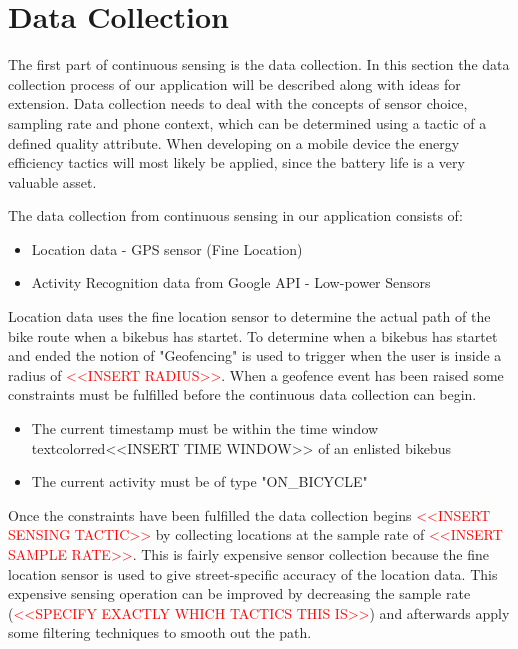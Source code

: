 


\section{Data Collection}

The first part of continuous sensing is the data collection. In this section the data collection process of our application will be described along with ideas for extension.
Data collection needs to deal with the concepts of sensor choice, sampling rate and phone context, which can be determined using a tactic of a defined quality attribute. When developing on a mobile device the energy efficiency tactics will most likely be applied, since the battery life is a very valuable asset.  

The data collection from continuous sensing in our application consists of: 
\begin{itemize}
    \item Location data - GPS sensor (Fine Location)
    \item Activity Recognition data from Google API - Low-power Sensors \cite{androidActivity}
\end{itemize}

Location data uses the fine location sensor to determine the actual path of the bike route when a bikebus has startet. To determine when a bikebus has startet and ended the notion of "Geofencing" is used to trigger when the user is inside a radius of \textcolor{red}{<<INSERT RADIUS>>}. 
When a geofence event has been raised some constraints must be fulfilled before the continuous data collection can begin.
\begin{itemize}
    \item The current timestamp must be within the time window textcolor{red}{<<INSERT TIME WINDOW>>} of an enlisted bikebus
    \item The current activity must be of type "ON\_BICYCLE"
\end{itemize}
Once the constraints have been fulfilled the data collection begins \textcolor{red}{<<INSERT SENSING TACTIC>>} by collecting locations at the sample rate of \textcolor{red}{<<INSERT SAMPLE RATE>>}. This is fairly expensive sensor collection because the fine location sensor is used to give street-specific accuracy of the location data. This expensive sensing operation can be improved by decreasing the sample rate (\textcolor{red}{<<SPECIFY EXACTLY WHICH TACTICS THIS IS>>}) and afterwards apply some filtering techniques to smooth out the path.

